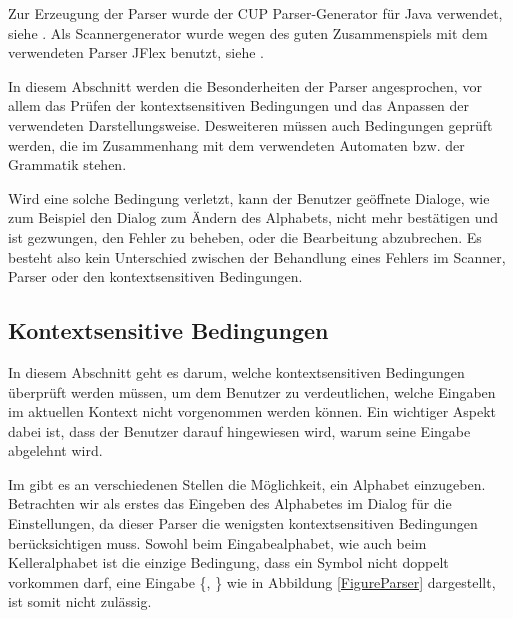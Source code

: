 Zur Erzeugung der Parser wurde der CUP Parser-Generator für Java verwendet, siehe
\cite{java-cup}. Als Scannergenerator wurde wegen des guten Zusammenspiels
mit dem verwendeten Parser JFlex benutzt, siehe \cite{jflex}.\vspace{10pt}

In diesem Abschnitt werden die Besonderheiten der Parser angesprochen, vor allem
das Prüfen der kontextsensitiven Bedingungen und das Anpassen der verwendeten
Darstellungsweise. Desweiteren müssen auch Bedingungen geprüft werden, die im
Zusammenhang mit dem verwendeten Automaten bzw. der Grammatik
stehen.\vspace{10pt}

Wird eine solche Bedingung verletzt, kann der Benutzer geöffnete Dialoge, wie zum
Beispiel den Dialog zum Ändern des Alphabets, nicht mehr bestätigen und ist
gezwungen, den Fehler zu beheben, oder die Bearbeitung abzubrechen. Es besteht
also kein Unterschied zwischen der Behandlung eines Fehlers im Scanner, Parser
oder den kontextsensitiven Bedingungen.\vspace{10pt}


\subsection{Kontextsensitive Bedingungen}\label{ParserContext}

In diesem Abschnitt geht es darum, welche kontextsensitiven Bedingungen
über\-prüft werden müssen, um dem Benutzer zu verdeutlichen, welche Eingaben im
aktuellen Kontext nicht vorgenommen werden können. Ein wichtiger Aspekt dabei
ist, dass der Benutzer darauf hingewiesen wird, warum seine Eingabe abgelehnt
wird.\vspace{10pt}

Im \gtitool gibt es an verschiedenen Stellen die Möglichkeit, ein Alphabet
einzugeben. Betrachten wir als erstes das Eingeben des Alphabetes im Dialog für
die Einstellungen, da dieser Parser die wenigsten kontextsensitiven Bedingungen
berücksichtigen muss. Sowohl beim Eingabealphabet, wie auch beim Kelleralphabet
ist die einzige Bedingung, dass ein Symbol nicht doppelt vorkommen darf, eine
Eingabe \{, \} wie in Abbildung \ref{FigureParser}
dargestellt, ist somit nicht zulässig.\vspace{10pt}

